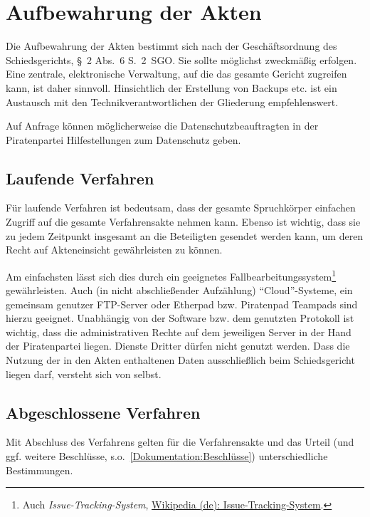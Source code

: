 \section{Aufbewahrung der Akten}
\label{Dokumentation:Aufbewahrung}
Die Aufbewahrung der Akten bestimmt sich nach der Geschäftsordnung des Schiedsgerichts, \S~2 Abs.~6 S.~2~SGO.
Sie sollte möglichst zweckmäßig erfolgen.
Eine zentrale, elektronische Verwaltung, auf die das gesamte Gericht zugreifen kann, ist daher sinnvoll.
Hinsichtlich der Erstellung von Backups etc. ist ein Austausch mit den Technikverantwortlichen der Gliederung empfehlenswert.

Auf Anfrage können möglicherweise die Datenschutzbeauftragten in der Piratenpartei Hilfestellungen zum Datenschutz geben.

\subsection{Laufende Verfahren}
Für laufende Verfahren ist bedeutsam, dass der gesamte Spruchkörper einfachen Zugriff auf die gesamte Verfahrensakte nehmen kann.
Ebenso ist wichtig, dass sie zu jedem Zeitpunkt insgesamt an die Beteiligten gesendet werden kann, um deren Recht auf Akteneinsicht gewährleisten zu können.

Am einfachsten lässt sich dies durch ein geeignetes Fallbearbeitungssystem\footnote{Auch \emph{Issue-Tracking-System}, \href{https://de.wikipedia.org/wiki/Issue-Tracking-System}{Wikipedia (de): Issue-Tracking-System}.} gewährleisten.
Auch (in nicht abschließender Aufzählung) \enquote{Cloud}-Systeme, ein gemeinsam genutzer FTP-Server oder Etherpad bzw. Piratenpad Teampads sind hierzu geeignet.
Unabhängig von der Software bzw. dem genutzten Protokoll ist wichtig, dass die administrativen Rechte auf dem jeweiligen Server in der Hand der Piratenpartei liegen.
Dienste Dritter dürfen nicht genutzt werden.
Dass die Nutzung der in den Akten enthaltenen Daten ausschließlich beim Schiedsgericht liegen darf, versteht sich von selbst.

\subsection{Abgeschlossene Verfahren}
Mit Abschluss des Verfahrens gelten für die Verfahrensakte und das Urteil (und ggf. weitere Beschlüsse, s.o.~\ref{Dokumentation:Beschlüsse}) unterschiedliche Bestimmungen.

